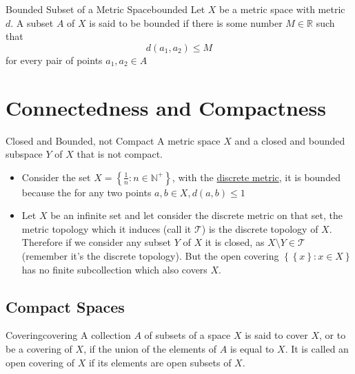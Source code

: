 





\begin{definition}{Bounded Subset of a Metric Space}{bounded}
Let $X$ be a metric space with metric $d$. A subset $A$ of $X$ is said to be bounded if there is some number $M \in  \mathbb{R}$ such that
\[
d\left(a_{1}, a_{2}\right) \leq M
\]
for every pair of points $ a_{ 1 } , a_{ 2 } \in  A $ 
\end{definition}


\section{Connectedness and Compactness}

\begin{example}{Closed and Bounded, not Compact}{}
A metric space $X$  and a closed and bounded subspace $Y$ of  $X$  that is not compact.
\end{example}

\begin{itemize}
    \item Consider the set $ X =  \left\{ \frac{1}{n}: n \in  \mathbb{N} ^{ +  }  \right\}  $, with the \hyperref[example:discrete_metric]{discrete metric}, it is bounded because the for any two points $ a, b \in X, d\left( a, b \right)  \le 1 $  %
    \item Let $ X $ be an infinite set and let consider the discrete metric on that set,  the metric topology which it induces (call it $ \mathcal{ T }  $)  is the discrete topology of $ X $. Therefore if we consider any subset $ Y $ of $ X $ it is closed, as $ X \setminus Y \in  \mathcal{ T }  $ (remember it's the discrete topology). But the open covering $ \left\{ \left\{ x \right\} : x \in  X \right\}  $ has no finite subcollection which also covers $ X $.
\end{itemize}



\subsection{Compact Spaces}

\begin{definition}{Covering}{covering}
A collection $A$ of subsets of a space $X$ is said to cover $X$, or to be a covering of $X$, if the union of the elements of $A$ is equal to $X$. It is called an open covering of $X$ if its elements are open subsets of $X$.
\end{definition}

